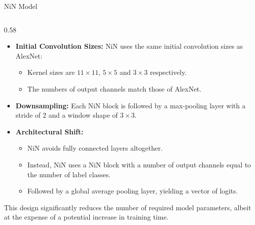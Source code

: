 \documentclass[aspectratio=169,xcolor=dvipsnames,svgnames,x11names,fleqn]{beamer}
\begin{document}
\begin{frame}[fragile]{NiN Model}
    \begin{columns}[T]
        \begin{column}{0.58\textwidth}
            \footnotesize
            \begin{itemize}
                \item \textbf{Initial Convolution Sizes:} NiN uses the same initial convolution sizes as AlexNet: 
                \begin{itemize}
                    \item Kernel sizes are $11\times 11$, $5\times 5$ and $3\times 3$ respectively.
                    \item The numbers of output channels match those of AlexNet.
                \end{itemize}
                \item \textbf{Downsampling:} Each NiN block is followed by a max-pooling layer with a stride of 2 and a window shape of $3\times 3$.
                \item \textbf{Architectural Shift:} 
                \begin{itemize}
                    \item NiN avoids fully connected layers altogether.
                    \item Instead, NiN uses a NiN block with a number of output channels equal to the number of label classes.
                    \item Followed by a global average pooling layer, yielding a vector of logits.
                \end{itemize}
            \end{itemize}
            
            \begin{tcolorbox}[colback=vggLightBlue!10, colframe=vggDeepBlue, arc=1mm, boxrule=0.5pt, left=2pt, right=2pt, top=2pt, bottom=2pt]
                \scriptsize
                This design significantly reduces the number of required model parameters, albeit at the expense of a potential increase in training time.
            \end{tcolorbox}
        \end{column}


\end{columns}
\end{frame}
\end{document}
